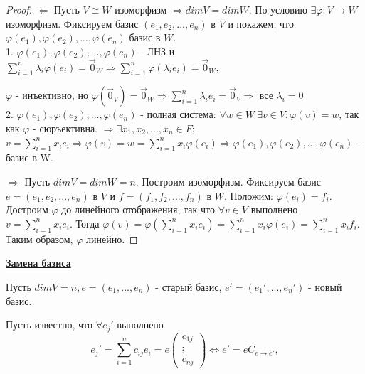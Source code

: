 \documentclass[a4paper, 12pt]{article}
\theoremstyle{definition}
\begin{document}
    \begin{proof}
        $\Longleftarrow $ Пусть $V \cong W$
        изоморфизм $\Rightarrow dimV=dimW$.
        По условию $\exists \varphi: V \to W$
        изоморфизм. Фиксируем базис $(e_1, e_2,..., e_n)$ в $V$ и
        покажем, что \\$\varphi (e_1), \varphi (e_2),...,
        \varphi (e_n)$ базис в $W$.\\
        1. $\varphi (e_1), \varphi (e_2),...,\varphi (e_n)$
        - ЛНЗ и $\sum \limits_{i=1}^{n} \lambda_i \varphi (e_i)
        = \vec 0_W \Rightarrow \sum \limits_{i=1}^{n} \varphi 
        (\lambda_i e_i) = \vec 0_W,$

        $\varphi$ - инъективно, но $\varphi (\vec 0_V) = \vec 0_W
        \Rightarrow \sum \limits_{i=1}^{n} \lambda_i
        e_i = \vec 0_V \Rightarrow$ все $\lambda_i = 0$\\
        2. $\varphi (e_1), \varphi (e_2),..., \varphi (e_n)$
        - полная система: $\forall w \in W\  \exists v \in V:
        \varphi (v) = w$, так как $\varphi$ - сюръективна.
        $\Rightarrow \exists x_1, x_2,..., x_n \in F$;
        $v = \sum \limits_{i=1}^n x_ie_i \Rightarrow 
        \varphi (v) = w = \sum\limits_{i=1}^n x_i\varphi (e_i)
        \Rightarrow \varphi(e_1), \varphi(e_2),...,
        \varphi(e_n)$ - базис в W.

        $\Longrightarrow $ Пусть $dimV = dimW = n.$ Построим
        изоморфизм. Фиксируем базис $e = (e_1, e_2,...,e_n)$
        в $V$ и $f = (f_1, f_2,...,f_n)$ в $W$. Положим:
        $\varphi (e_i) = f_i$. Достроим $\varphi$ до
        линейного отображения, так что $\forall v \in V$
        выполнено $v = \sum\limits_{i=1}^n x_ie_i$.
        Тогда $\varphi (v) = \varphi (\sum\limits_{i=1}^n x_ie_i)
        = \sum\limits_{i=1}^n x_i \varphi (e_i) =
        \sum\limits_{i=1}^n x_if_i$. Таким образом, $\varphi$
        линейно.

    \end{proof}
    \underline{\textbf{Замена базиса}}

    Пусть $dimV = n, e = (e_1,...,e_n)$ - старый базис,
    $e' = (e_1',...,e_n')$ - новый базис.
    
    Пусть известно, что $\forall e_j'$ выполнено $$e_j' = 
    \sum\limits_{i=1}^n c_{ij}e_i = e
    \begin{pmatrix}
        c_{1j}\\
        \vdots\\
        c_{nj}
    \end{pmatrix}
    \Leftrightarrow e'= eC_{e \to e'},$$
    
\end{document}
